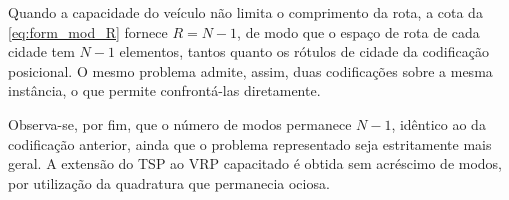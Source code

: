         Quando a capacidade do veículo não limita o comprimento da rota, a cota da \autoref{eq:form_mod_R} fornece $R = N-1$, de modo que o espaço de rota de cada cidade tem $N-1$ elementos, tantos quanto os rótulos de cidade da codificação posicional. O mesmo problema admite, assim, duas codificações sobre a mesma instância, o que permite confrontá-las diretamente.

        Observa-se, por fim, que o número de modos permanece $N-1$, idêntico ao da codificação anterior, ainda que o problema representado seja estritamente mais geral. A extensão do TSP ao VRP capacitado é obtida sem acréscimo de modos, por utilização da quadratura que permanecia ociosa.
